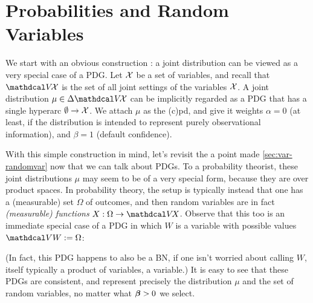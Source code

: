 \section{Probabilities and Random Variables}
    \label{sec:prob-as-pdg}


We start with an obvious construction
\unskip: a joint distribution can be viewed as a very special case of a PDG. 
Let $\mathcal X$ be a set of variables, and recall that $\V\!\X$ is the set of all joint settings of the variables $\mathcal X$. 
A joint distribution $\mu \in \Delta \V\!\X$ can be implicitly regarded as a PDG that has a single hyperarc $\emptyset \to \mathcal X$.
We attach $\mu$ as the (c)pd, and give it weights $\alpha=0$
%
(at least, if the distribution is intended to represent purely observational information), and 
$\beta = 1$ (default confidence). 

With this simple construction in mind,  
    let's revisit the a point made \cref{sec:var-randomvar}
    now that we can talk about PDGs. 
To a probability theorist, these joint distributions $\mu$ may seem to be of a very special form, because they are over product spaces. 
In probability theory, the setup is typically instead that one has a (measurable) set $\Omega$ of outcomes, and then random variables are in fact \emph{(measurable) functions} $X : \Omega \to \V\!X$. 
Observe that this too is an immediate special case of a PDG
in which $W$ is a variable with possible values $\V W := \Omega$:
%
\begin{center}
\end{center}
%
(In fact, this PDG happens to also be a BN, if one isn't worried about calling $W$, itself typically a product of variables, a variable.)
It is easy to see that these PDGs are consistent, and represent precisely the distribution $\mu$ and the set of random variables, no matter what $\boldsymbol\beta > 0$ we select.

